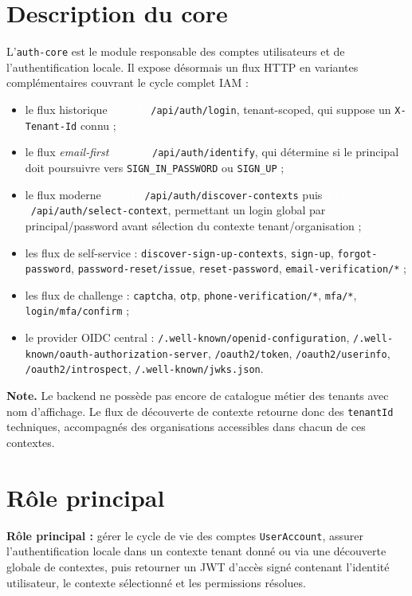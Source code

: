 \documentclass[11pt,a4paper,oneside]{report}
\newcommand{\code}[1]{\texttt{\small #1}}
\newcommand{\httppost}{\textcolor{white}{\colorbox{green!45!black}{\scriptsize\ttfamily\,POST\,}}}
\begin{document}
\section{Description du core}
L'\code{auth-core} est le module responsable des comptes utilisateurs et de
l'authentification locale. Il expose désormais un flux HTTP en variantes complémentaires
couvrant le cycle complet IAM :
\begin{itemize}[leftmargin=1.4em,itemsep=1pt]
  \item le flux historique \httppost~\code{/api/auth/login}, tenant-scoped, qui suppose un \code{X-Tenant-Id} connu ;
  \item le flux \emph{email-first} \httppost~\code{/api/auth/identify}, qui détermine si le principal doit poursuivre vers \code{SIGN\_IN\_PASSWORD} ou \code{SIGN\_UP} ;
  \item le flux moderne \httppost~\code{/api/auth/discover-contexts} puis \httppost~\code{/api/auth/select-context}, permettant un login global par principal/password avant sélection du contexte tenant/organisation ;
  \item les flux de self-service : \code{discover-sign-up-contexts}, \code{sign-up}, \code{forgot-password}, \code{password-reset/issue}, \code{reset-password}, \code{email-verification/*} ;
  \item les flux de challenge : \code{captcha}, \code{otp}, \code{phone-verification/*}, \code{mfa/*}, \code{login/mfa/confirm} ;
  \item le provider OIDC central : \code{/.well-known/openid-configuration}, \code{/.well-known/oauth-authorization-server}, \code{/oauth2/token}, \code{/oauth2/userinfo}, \code{/oauth2/introspect}, \code{/.well-known/jwks.json}.
\end{itemize}

\begin{notebox}
\textbf{Note.} Le backend ne possède pas encore de catalogue métier des tenants avec nom
d'affichage. Le flux de découverte de contexte retourne donc des \code{tenantId} techniques,
accompagnés des organisations accessibles dans chacun de ces contextes.
\end{notebox}

\section{Rôle principal}
\begin{rolebox}
\textbf{Rôle principal :} gérer le cycle de vie des comptes \code{UserAccount}, assurer
l'authentification locale dans un contexte tenant donné ou via une découverte globale de
contextes, puis retourner un JWT d'accès signé contenant l'identité utilisateur, le contexte
sélectionné et les permissions résolues.
\end{rolebox}
\end{document}
